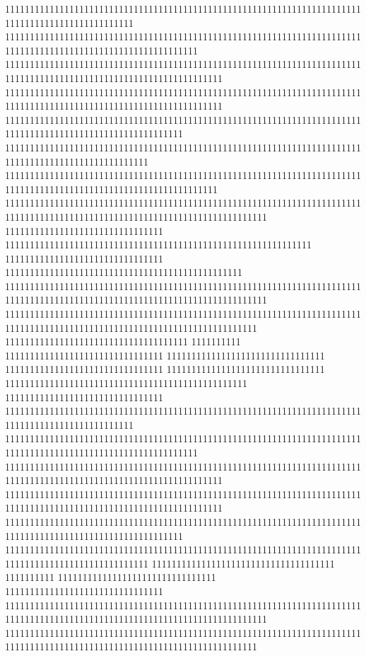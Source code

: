 11111111111111111111111111111111111111111111111111111111111111111111111111111111111111111111111111
111111111111111111111111111111111111111111111111111111111111111111111111111111111111111111111111111111111111111
11111111111111111111111111111111111111111111111111111111111111111111111111111111111111111111111111111111111111111111
11111111111111111111111111111111111111111111111111111111111111111111111111111111111111111111111111111111111111111111
111111111111111111111111111111111111111111111111111111111111111111111111111111111111111111111111111111111111
11111111111111111111111111111111111111111111111111111111111111111111111111111111111111111111111111111
1111111111111111111111111111111111111111111111111111111111111111111111111111111111111111111111111111111111111111111
11111111111111111111111111111111111111111111111111111111111111111111111111111111111111111111111111111111111111111111111111111
11111111111111111111111111111111
11111111111111111111111111111111111111111111111111111111111111
11111111111111111111111111111111
111111111111111111111111111111111111111111111111
11111111111111111111111111111111111111111111111111111111111111111111111111111111111111111111111111111111111111111111111111111
111111111111111111111111111111111111111111111111111111111111111111111111111111111111111111111111111111111111111111111111111
1111111111111111111111111111111111111
1111111111
11111111111111111111111111111111
11111111111111111111111111111111
11111111111111111111111111111111
11111111111111111111111111111111
1111111111111111111111111111111111111111111111111
11111111111111111111111111111111
11111111111111111111111111111111111111111111111111111111111111111111111111111111111111111111111111
111111111111111111111111111111111111111111111111111111111111111111111111111111111111111111111111111111111111111
11111111111111111111111111111111111111111111111111111111111111111111111111111111111111111111111111111111111111111111
11111111111111111111111111111111111111111111111111111111111111111111111111111111111111111111111111111111111111111111
111111111111111111111111111111111111111111111111111111111111111111111111111111111111111111111111111111111111
11111111111111111111111111111111111111111111111111111111111111111111111111111111111111111111111111111
1111111111111111111111111111111111111
1111111111
11111111111111111111111111111111
11111111111111111111111111111111
11111111111111111111111111111111111111111111111111111111111111111111111111111111111111111111111111111111111111111111111111111
111111111111111111111111111111111111111111111111111111111111111111111111111111111111111111111111111111111111111111111111111
